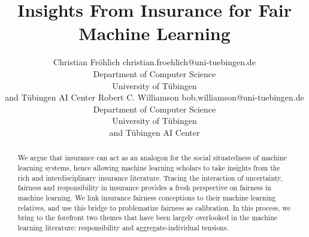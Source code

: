 \documentclass[11pt]{article} %
\title{Insights From Insurance for Fair Machine Learning}
\author{\name Christian Fröhlich \email christian.froehlich@uni-tuebingen.de \\
      \addr Department of Computer Science\\
      University of Tübingen\\ 
      and Tübingen AI Center
      \AND
      \name Robert C. Williamson \email bob.williamson@uni-tuebingen.de \\
      \addr Department of Computer Science\\
      University of Tübingen\\ 
      and Tübingen AI Center
      }
\begin{document}
\maketitle

\begin{abstract}
We argue that insurance can act as an analogon for the social situatedness of machine learning systems, hence allowing machine learning scholars to take insights from the rich and interdisciplinary insurance literature. Tracing the interaction of uncertainty, fairness and responsibility in insurance provides a fresh perspective on fairness in machine learning. We link insurance fairness conceptions to their machine learning relatives, and use this bridge to problematize fairness as calibration. 
In this process, we bring to the forefront two themes that have been largely overlooked in the machine learning literature: 
responsibility and aggregate-individual tensions.

% 
% 


\end{abstract}
\end{document}
